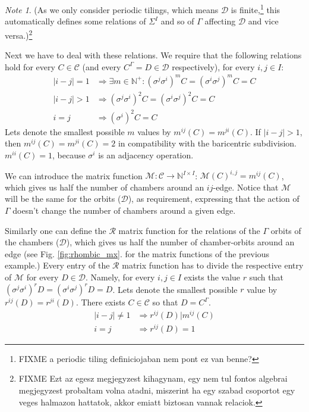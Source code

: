 \documentclass[12pt,a4paper]{article}
\numberwithin{equation}{section}
\theoremstyle{plain}%
\theoremstyle{definition}
\theoremstyle{remark}
\newtheorem*{note}{Note}
\begin{document}
\begin{note}
(As we only consider periodic tilings, which means $\mathcal{D}$ is
finite,\footnote{FIXME a periodic tiling definiciojaban nem pont ez van benne?} this
automatically defines some relations of $\Sigma^I$ and so of $\Gamma$ affecting
$\mathcal{D}$ and vice versa.)\footnote{FIXME Ezt az egesz megjegyzest
kihagynam, egy nem tul fontos algebrai megjegyzest probaltam volna atadni,
miszerint ha egy szabad csoportot egy veges halmazon hattatok, akkor emiatt biztosan
vannak relaciok.}
\end{note}

Next we have to deal with these relations. We require that the following
relations hold for every $C\in\mathcal{C}$ (and every $C^\Gamma=D\in\mathcal{D}$
respectively), for every $i,j\in I$:
\begin{align}
  \label{eqn:mxfun_constraint_begin}|i-j|=1 & \Rightarrow \exists m\in\mathbb{N}^+: (\sigma^j\sigma^i)^mC=(\sigma^i\sigma^j)^mC=C \\
  |i-j|>1 & \Rightarrow (\sigma^j\sigma^i)^2C=(\sigma^i\sigma^j)^2C=C \\
  i=j & \Rightarrow (\sigma^i)^2C=C
\end{align}
Lets denote the smallest possible $m$ values by $m^{ij}(C)=m^{ji}(C)$.
If $|i-j|>1$, then $m^{ij}(C)=m^{ji}(C)=2$ in compatibility with the baricentric subdivision.  
$m^{ii}(C)=1$, because $\sigma^i$ is an adjacency operation.

We can introduce the matrix function $\mathcal{M}: \mathcal{C}
\rightarrow \mathbb{N}^{I\times I}$: $\mathcal{M}(C)^{i,j}=m^{ij}(C)$, which
gives us half the number of chambers around an $ij$-edge. Notice that $\mathcal{M}$
will be the same for the orbits ($\mathcal{D}$), as requirement, expressing that
the action of $\Gamma$ doesn't change the number of chambers around a given
edge.

Similarly one can define the $\mathcal{R}$ matrix function for the
relations of the $\Gamma$ orbits of the chambers ($\mathcal{D}$), which gives us
half the number of chamber-orbits around an edge (see Fig. \ref{fig:rhombic_mx}.
for the matrix functions of the previous example.) Every entry of the $\mathcal{R}$
matrix function has to divide the respective entry of $\mathcal{M}$ for
every $D\in\mathcal{D}$. Namely, for every $i,j\in I$ exists the value $r$ such that
$(\sigma^j\sigma^i)^rD=(\sigma^i\sigma^j)^rD=D$. Lets denote the smallest
possible $r$ value by $r^{ij}(D)=r^{ji}(D)$. There exists $C\in\mathcal{C}$ so
that $D=C^\Gamma$.
\begin{align}
  |i-j|\ne1 & \Rightarrow r^{ij}(D)|m^{ij}(C) \\
  \label{eqn:mxfun_constraint_end}i=j & \Rightarrow r^{ij}(D)=1
\end{align}
\end{document}
